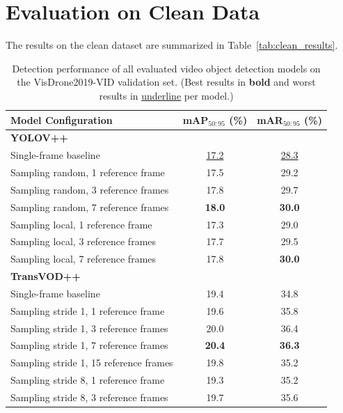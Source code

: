 \documentclass[final,twoside]{vutinfth}
\begin{document}
\section{Evaluation on Clean Data}

The results on the clean dataset are summarized in Table~\ref{tab:clean_results}.
\begin{table}[htbp]
\centering
\caption{Detection performance of all evaluated video object detection models on the VisDrone2019-VID validation set. (Best results in \textbf{bold} and worst results in \underline{underline} per model.)}

\small
\setlength{\tabcolsep}{6pt}

\begin{tabular}{p{} c c}
\toprule
\rowcolor{tableheader}
\textbf{Model Configuration} & \textbf{mAP$_{50:95}$ (\%)} & \textbf{mAR$_{50:95}$ (\%)} \\
\midrule
\multicolumn{3}{l}{\textbf{YOLOV++}} \\
Single-frame baseline                 & \underline{17.2} & \underline{28.3} \\
Sampling random, 1 reference frame         & 17.5 & 29.2 \\
Sampling random, 3 reference frames        & 17.8 & 29.7 \\
Sampling random, 7 reference frames        & \textbf{18.0} & \textbf{30.0} \\
Sampling local, 1 reference frame         & 17.3 & 29.0 \\
Sampling local, 3 reference frames        & 17.7 & 29.5 \\
Sampling local, 7 reference frames        & 17.8 & \textbf{30.0} \\
\midrule
\multicolumn{3}{l}{\textbf{TransVOD++}} \\
Single-frame baseline                 & 19.4 & 34.8 \\
Sampling stride 1, 1 reference frame         & 19.6 & 35.8 \\
Sampling stride 1, 3 reference frames        & 20.0 & 36.4 \\
Sampling stride 1, 7 reference frames        & \textbf{20.4} & \textbf{36.3} \\
Sampling stride 1, 15 reference frames       & 19.8 & 35.2 \\
Sampling stride 8, 1 reference frame         & 19.3 & 35.2 \\
Sampling stride 8, 3 reference frames        & 19.7 & 35.6 \\

\end{tabular}
\end{table}
\end{document}
